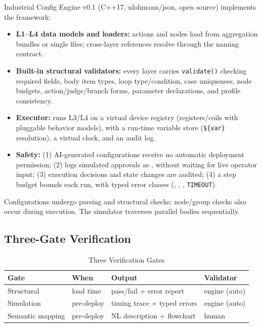 \documentclass[conference]{IEEEtran}
\begin{document}
Industrial Config Engine v0.1 (C++17, nlohmann/json, open source) implements the framework:
\begin{itemize}
\item \textbf{L1--L4 data models and loaders:} actions and nodes load from aggregation bundles or single files; cross-layer references resolve through the naming contract.
\item \textbf{Built-in structural validators:} every layer carries \texttt{validate()} checking required fields, body item types, loop type/condition, case uniqueness, node budgets, action/judge/branch forms, parameter declarations, and profile consistency.
\item \textbf{Executor:} runs L3/L4 on a virtual device registry (registers/coils with pluggable behavior models), with a run-time variable store (\texttt{\$\{var\}} resolution), a virtual clock, and an audit log.
\item \textbf{Safety:} (1) AI-generated configurations receive no automatic deployment permission; (2)  logs simulated approvals as , without waiting for live operator input; (3) execution decisions and state changes are audited; (4) a step budget bounds each run, with typed error classes (, , , \texttt{TIMEOUT}).
\end{itemize}

Configurations undergo parsing and structural checks; node/group checks also occur during execution. The simulator traverses parallel bodies sequentially.

\subsection{Three-Gate Verification}

\begin{table}[t]
\caption{Three Verification Gates}
\label{tab:gates}
\centering
\small
\begin{tabular}{|P{1.5cm}|P{1.5cm}|P{2.4cm}|P{1.3cm}|}
\hline
\textbf{Gate} & \textbf{When} & \textbf{Output} & \textbf{Validator}\\
\hline
Structural & load time & pass/fail + error report & engine (auto)\\
\hline
Simulation & pre-deploy & timing trace + typed errors & engine (auto)\\
\hline
Semantic mapping & pre-deploy & NL description + flowchart & human\\
\hline
\end{tabular}
\end{table}
\end{document}
